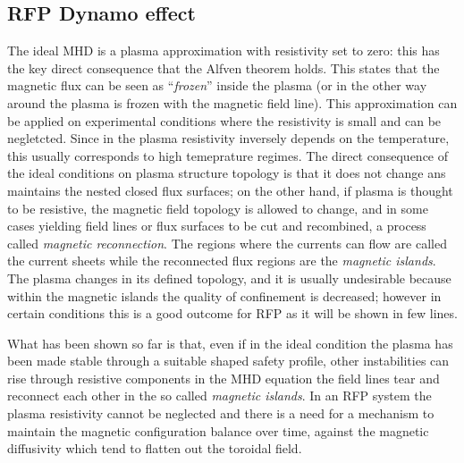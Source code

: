 


\subsection{RFP Dynamo effect}

The ideal MHD is a plasma approximation with resistivity set to zero: this has the key direct consequence that the Alfven theorem holds. This states that the magnetic flux can be seen as ``\textit{frozen}'' inside the plasma (or in the other way around the plasma is frozen with the magnetic field line).
This approximation can be applied on experimental conditions where the resistivity is small and can be negletcted. Since in the plasma resistivity inversely depends on the temperature, this usually corresponds to high temeprature regimes.
The direct consequence of the ideal conditions on plasma structure topology is that it does not change ans maintains the nested closed flux surfaces; on the other hand, if plasma is thought to be resistive, the magnetic field topology is allowed to change, and in some cases yielding field lines or flux surfaces to be cut and recombined, a process called \textit{magnetic reconnection}. The regions where the currents can flow are called the current sheets while the reconnected flux regions are the \textit{magnetic islands}. The plasma changes in its defined topology, and it is usually undesirable because within the magnetic islands the quality of confinement is decreased; however in certain conditions this is a good outcome for RFP as it will be shown in few lines.

What has been shown so far is that, even if in the ideal condition the plasma has been made stable through a suitable shaped safety profile, other instabilities can rise through resistive components in the MHD equation the field lines tear and reconnect each other in the so called \textit{magnetic islands}.
In an RFP system the plasma resistivity cannot be neglected and there is a need for a mechanism to maintain the magnetic configuration balance over time, against the magnetic diffusivity which tend to flatten out the toroidal field.

